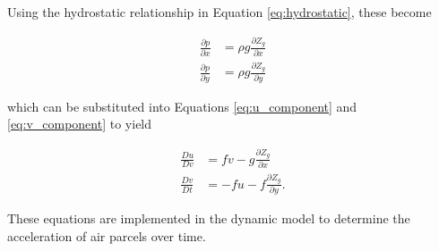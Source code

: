 Using the hydrostatic relationship in Equation \ref{eq:hydrostatic}, these become

\begin{align}
    \frac{\partial p}{\partial x} &= \rho g \frac{\partial Z_g}{\partial x} \\
    \frac{\partial p}{\partial y} &= \rho g \frac{\partial Z_g}{\partial y}
\end{align}

which can be substituted into Equations \ref{eq:u_component} and \ref{eq:v_component} to yield

\begin{align}
    \frac{Du}{Dv} &= fv - g \frac{\partial Z_g}{\partial x} \label{eq:uvelocity} \\
    \frac{Dv}{Dt} &= - fu - f \frac{\partial Z_g}{\partial y}. \label{eq:vvelocity}
\end{align}

These equations are implemented in the dynamic model to determine the acceleration of air parcels over time.
